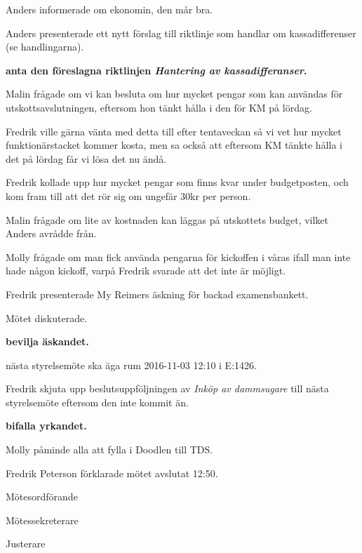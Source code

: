 \documentclass[10pt]{article}
\def\mo{Fredrik Peterson}
\def\ms{Erik Månsson}
\def\ji{Stephanie Mirsky}
\begin{document}
\begin{paragrafer}
\begin{paragrafer}
Anders informerade om ekonomin, den mår bra.

\end{paragrafer}

Anders presenterade ett nytt förslag till riktlinje som handlar om kassadifferenser (se handlingarna).

\textbf{\Mba anta den föreslagna riktlinjen \emph{Hantering av kassadifferanser}.}

Malin frågade om vi kan besluta om hur mycket pengar som kan användas för utskottsavslutningen, eftersom hon tänkt hålla i den för KM på lördag.

Fredrik ville gärna vänta med detta till efter tentaveckan så vi vet hur mycket funktionärstacket kommer kosta, men sa också att eftersom KM tänkte hålla i det på lördag får vi lösa det nu ändå.

Fredrik kollade upp hur mycket pengar som finns kvar under budgetposten, och kom fram till att det rör sig om ungefär 30kr per person.

Malin frågade om lite av kostnaden kan läggas på utskottets budget, vilket Anders avrådde från.

Molly frågade om man fick använda pengarna för kickoffen i våras ifall man inte hade någon kickoff, varpå Fredrik svarade att det inte är möjligt.

Fredrik presenterade My Reimers äskning för backad examensbankett.

Mötet diskuterade.

\textbf{\Mba bevilja äskandet.}

\Mba nästa styrelsemöte ska äga rum 2016-11-03 12:10 i E:1426.

Fredrik \ypa skjuta upp beslutsuppföljningen av \emph{Inköp av dammsugare} till nästa styrelsemöte eftersom den inte kommit än.

\textbf{\Mba bifalla yrkandet.}

Molly påminde alla att fylla i Doodlen till TDS.

{\mo} förklarade mötet avslutat 12:50.

\end{paragrafer}

\hidesignfoot
\begin{signatures}{3}
\signature{\mo}{Mötesordförande}
\signature{\ms}{Mötessekreterare}
\signature{\ji}{Justerare}
\end{signatures}
\end{document}
